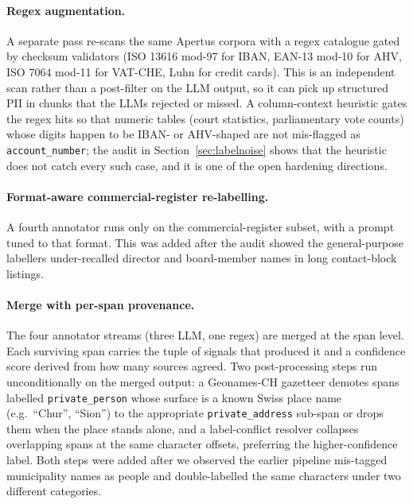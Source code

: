 \documentclass[sigconf,nonacm]{acmart}
\begin{document}
\paragraph{Regex augmentation.} A separate pass re-scans the same
Apertus corpora with a regex catalogue gated by checksum validators
(ISO 13616 mod-97 for IBAN, EAN-13 mod-10 for AHV, ISO 7064 mod-11
for VAT-CHE, Luhn for credit cards). This is an independent scan
rather than a post-filter on the LLM output, so it can pick up
structured PII in chunks that the LLMs rejected or missed. A
column-context heuristic gates the regex hits so that numeric
tables (court statistics, parliamentary vote counts) whose digits
happen to be IBAN- or AHV-shaped are not mis-flagged as
\texttt{account\_number}; the audit in
Section~\ref{sec:labelnoise} shows that the heuristic does not
catch every such case, and it is one of the open hardening
directions.

\paragraph{Format-aware commercial-register re-labelling.} A
fourth annotator runs only on the commercial-register subset, with
a prompt tuned to that format. This was added after the audit
showed the general-purpose labellers under-recalled director and
board-member names in long contact-block listings.

\paragraph{Merge with per-span provenance.} The four annotator
streams (three LLM, one regex) are merged at the span level. Each
surviving span carries the tuple of signals that produced it and a
confidence score derived from how many sources agreed. Two
post-processing steps run unconditionally on the merged output: a
Geonames-CH gazetteer demotes spans labelled \texttt{private\_person}
whose surface is a known Swiss place name (e.g.\ ``Chur'', ``Sion'')
to the appropriate \texttt{private\_address} sub-span or drops them
when the place stands alone, and a label-conflict resolver collapses
overlapping spans at the same character offsets, preferring the
higher-confidence label. Both steps were added after we observed
the earlier pipeline mis-tagged municipality names as people and
double-labelled the same characters under two different categories.
\end{document}
